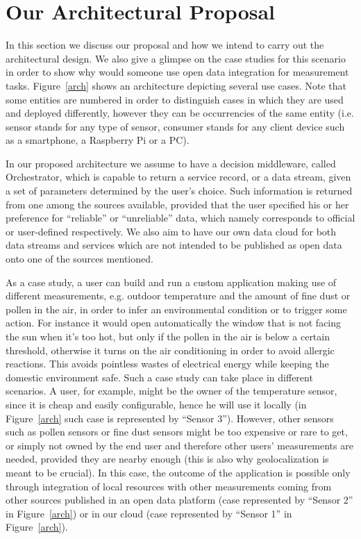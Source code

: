 \section{Our Architectural Proposal}
\label{sec:casestudy}
In this section we discuss our proposal and how we intend to carry out the architectural design.
We also give a glimpse on the case studies for this scenario in order to show why would someone use open data integration for measurement tasks.
Figure~\ref{arch} shows an architecture depicting several use cases.
Note that some entities are numbered in order to distinguish cases in which they are used and deployed differently, however they can be occurrencies of the same entity (i.e. sensor stands for any type of sensor, consumer stands for any client device such as a smartphone, a Raspberry Pi or a PC). 

In our proposed architecture we assume to have a decision middleware, called Orchestrator, which is capable to return a service record, or a data stream, given a set of parameters determined by the user's choice.
Such information is returned from one among the sources available, provided that the user specified his or her preference for ``reliable'' or ``unreliable'' data, which namely corresponds to official or user-defined respectively.
We also aim to have our own data cloud for both data streams and services which are not intended to be published as open data onto one of the sources mentioned.

As a case study, a user can build and run a custom application making use of different measurements, e.g. outdoor temperature and the amount of fine dust or pollen in the air, in order to infer an environmental condition or to trigger some action.
For instance it would open automatically the window that is not facing the sun when it's too hot, but only if the pollen in the air is below a certain threshold, otherwise it turns on the air conditioning in order to avoid allergic reactions.
This avoids pointless wastes of electrical energy while keeping the domestic environment safe.
Such a case study can take place in different scenarios.
A user, for example, might be the owner of the temperature sensor, since it is cheap and easily configurable, hence he will use it locally (in Figure~\ref{arch} such case is represented by ``Sensor 3'').
However, other sensors such as pollen sensors or fine dust sensors might be too expensive or rare to get, or simply not owned by the end user and therefore other users' measurements are needed, provided they are nearby enough (this is also why geolocalization is meant to be crucial).
In this case, the outcome of the application is possible only through integration of local resources with other measurements coming from other sources published in an open data platform (case represented by ``Sensor 2'' in Figure~\ref{arch}) or in our cloud (case represented by ``Sensor 1'' in Figure~\ref{arch}).%

